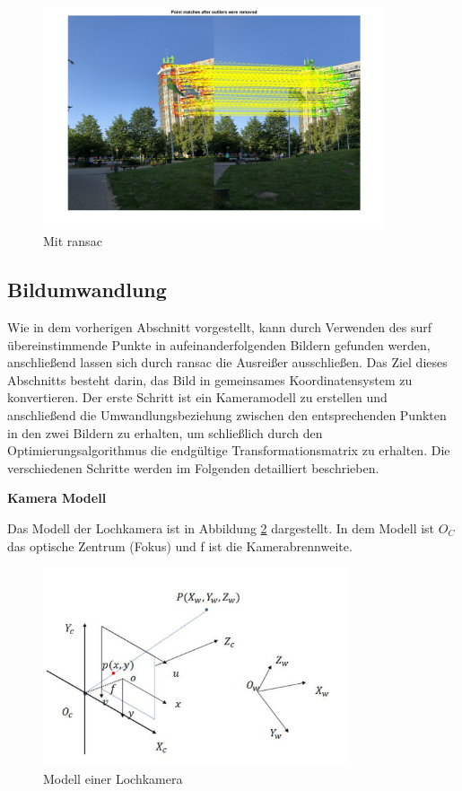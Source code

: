 \begin{figure}[H]
 \centering 
 \includegraphics[keepaspectratio,width=0.9\textwidth]{images/3_Ersteverfahren/RANSAC/MitRANSAC.pdf}
 \caption{Mit \gls{ransac}}
 \label{fig:MitRANSAC}
\end{figure} 


\subsection{Bildumwandlung}

Wie in dem vorherigen Abschnitt vorgestellt, kann durch Verwenden des \gls{surf} übereinstimmende Punkte in aufeinanderfolgenden Bildern gefunden werden, anschließend lassen sich durch \gls{ransac} die Ausreißer ausschließen. Das Ziel dieses Abschnitts besteht darin, das Bild in gemeinsames Koordinatensystem zu konvertieren. Der erste Schritt ist ein Kameramodell zu erstellen und anschließend die Umwandlungsbeziehung zwischen den entsprechenden Punkten in den zwei Bildern zu erhalten, um schließlich durch den Optimierungsalgorithmus die endgültige Transformationsmatrix zu erhalten. Die verschiedenen Schritte werden im Folgenden detailliert beschrieben.

\textbf{Kamera Modell}

Das Modell der Lochkamera ist in Abbildung \ref{fig:cameramodel} dargestellt. In dem Modell ist $O_C$ das optische Zentrum (Fokus) und f ist die Kamerabrennweite.

\begin{figure}[htb]
 \centering 
 \includegraphics[keepaspectratio,width=0.8\textwidth]{images/3_Ersteverfahren/Kamera/cameramodel.pdf}
 \caption{Modell einer Lochkamera}
 \label{fig:cameramodel}
\end{figure} 


